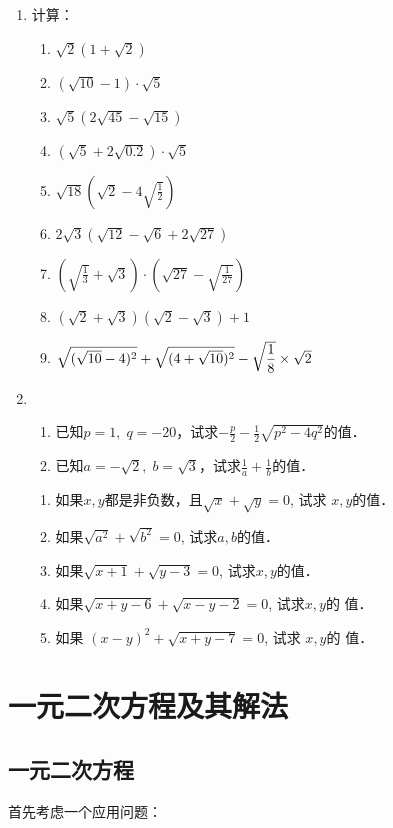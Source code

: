 \begin{enumerate}
\item 计算：
\begin{enumerate}
    \item $\sqrt{2}(1+\sqrt{2})$
    \item $(\sqrt{10}-1)\cdot \sqrt{5}$
    \item $\sqrt{5}(2\sqrt{45}-\sqrt{15})$
    \item $(\sqrt{5}+2\sqrt{0.2})\cdot \sqrt{5}$
    \item $\sqrt{18}\left(\sqrt{2}-4\sqrt{\frac{1}{2}}\right)$
    \item $2\sqrt{3}\left(\sqrt{12}-\sqrt{6}+2\sqrt{27}\right)$
    \item $\left(\sqrt{\frac{1}{3}}+\sqrt{3}\right)\cdot \left(\sqrt{27}-\sqrt{\frac{1}{27}}\right)$
    \item $(\sqrt{2}+\sqrt{3})(\sqrt{2}-\sqrt{3})+1$
    \item $\sqrt{(\sqrt{10}-4)^2}+\sqrt{(4+\sqrt{10})^2}-\sqrt{\dfrac{1}{8}}\times \sqrt{2}$
\end{enumerate}

\item \begin{enumerate}
    \item 已知$p=1, \; q=-20$，试求$-\frac{p}{2}-\frac{1}{2}\sqrt{p^2-4q^2}$的值．
    \item 已知$a=-\sqrt{2},\; b=\sqrt{3}$，试求$\frac{1}{a}+\frac{1}{b}$的值． 
\end{enumerate}

\begin{enumerate}
    \item 如果$x,y$都是非负数，且$\sqrt{x}+\sqrt{y}=0$, 试求
$x,y$的值．
\item 如果$\sqrt{a^2}+\sqrt{b^2}=0$, 试求$a,b$的值．
\item 如果$\sqrt{x+1}+\sqrt{y-3}=0$, 试求$x,y$的值．
\item 如果$\sqrt{x+y-6}+\sqrt{x-y-2}=0$, 试求$x,y$的
值．
\item 如果
$(x-y)^2+\sqrt{x+y-7}=0$, 试求 $x,y$的
值．
\end{enumerate}

\end{enumerate}

\section{一元二次方程及其解法}
\subsection{一元二次方程}
首先考虑一个应用问题：

